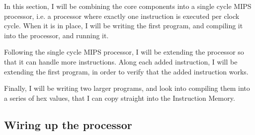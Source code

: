 In this section, I will be combining the core components into a single cycle
MIPS processor, i.e. a processor where exactly one instruction is executed per
clock cycle. When it is in place, I will be writing the first program, and
compiling it into the processor, and running it.

Following the single cycle MIPS processor, I will be extending
the processor so that it can handle more instructions. Along each added
instruction, I will be extending the first program, in order to verify that
the added instruction works.

Finally, I will be writing two larger programs, and look into compiling them
into a series of hex values, that I can copy straight into the Instruction
Memory.

\subsection{Wiring up the processor}
